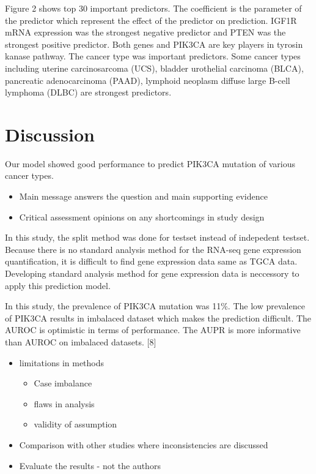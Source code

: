 \documentclass[10pt,letterpaper]{article}
\providecommand{\tightlist}{%
  \setlength{\itemsep}{0pt}\setlength{\parskip}{0pt}}
\begin{document}
Figure 2 shows top 30 important predictors. The coefficient is the
parameter of the predictor which represent the effect of the predictor
on prediction. IGF1R mRNA expression was the strongest negative
predictor and PTEN was the strongest positive predictor. Both genes and
PIK3CA are key players in tyrosin kanase pathway. The cancer type was
important predictors. Some cancer types including uterine carcinosarcoma
(UCS), bladder urothelial carcinoma (BLCA), pancreatic adenocarcinoma
(PAAD), lymphoid neoplasm diffuse large B-cell lymphoma (DLBC) are
strongest predictors.

\hypertarget{discussion}{%
\section{Discussion}\label{discussion}}

Our model showed good performance to predict PIK3CA mutation of various
cancer types.

\begin{itemize}
\item
  Main message answers the question and main supporting evidence
\item
  Critical assessment opinions on any shortcomings in study design
\end{itemize}

In this study, the split method was done for testset instead of
indepedent testset. Because there is no standard analysis method for the
RNA-seq gene expression quantification, it is difficult to find gene
expression data same as TGCA data. Developing standard analysis method
for gene expression data is neccessory to apply this prediction model.

In this study, the prevalence of PIK3CA mutation was 11\%. The low
prevalence of PIK3CA results in imbalaced dataset which makes the
prediction difficult. The AUROC is optimistic in terms of performance.
The AUPR is more informative than AUROC on imbalaced datasets. {[}8{]}

\begin{itemize}
\item
  limitations in methods

  \begin{itemize}
  \tightlist
  \item
    Case imbalance\\
  \item
    flaws in analysis\\
  \item
    validity of assumption
  \end{itemize}
\item
  Comparison with other studies where inconsistencies are discussed\\
\item
  Evaluate the results - not the authors
\end{itemize}
\end{document}
